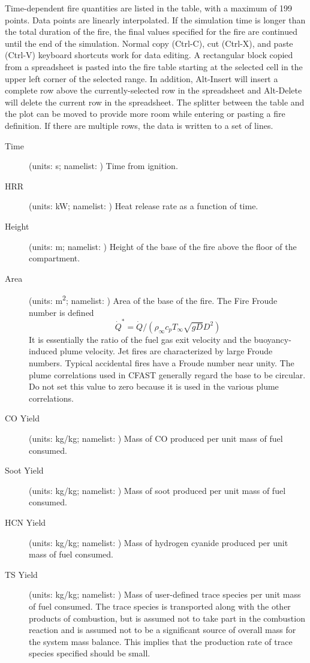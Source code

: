{{Time-dependent fire quantities are listed in the table, with a maximum of 199 points. Data points are linearly interpolated. If the simulation time is longer than the total duration of the fire, the final values specified for the fire are continued until the end of the simulation. Normal copy (Ctrl-C), cut (Ctrl-X), and paste (Ctrl-V) keyboard shortcuts work for data editing. A rectangular block copied from a spreadsheet is pasted into the fire table starting at the selected cell in the upper left corner of the selected range. In addition, Alt-Insert will insert a complete row above the currently-selected row in the spreadsheet and Alt-Delete will delete the current row in the spreadsheet. The splitter between the table and the plot can be moved to provide more room while entering or pasting a fire definition. If there are multiple rows, the data is written to a set of  lines.
\begin{description}
    \item[Time] (units: s; namelist: ) Time from ignition.
    \item[HRR] (units: kW; namelist: ) Heat release rate as a function of time.
    \item[Height] (units: m; namelist: ) Height of the base of the fire above the floor of the compartment.
    \item[Area] (units: \unit{m^2}; namelist: ) Area of the base of the fire.  The Fire Froude number is defined $$\dot{Q}^* = \dot{Q}/(\rho_\infty c_p T_\infty \sqrt{gD} D^2)$$ It is essentially the ratio of the fuel gas exit velocity and the buoyancy-induced plume velocity. Jet fires are characterized by large Froude numbers. Typical accidental fires have a Froude number near unity. The plume correlations used in CFAST generally regard the base to be circular. Do not set this value to zero because it is used in the various plume correlations.
    \item[CO Yield] (units: kg/kg; namelist: ) Mass of CO produced per unit mass of fuel consumed.
    \item[Soot Yield] (units: kg/kg; namelist: ) Mass of soot produced per unit mass of fuel consumed.
    \item[HCN Yield] (units: kg/kg; namelist: ) Mass of hydrogen cyanide produced per unit mass of fuel consumed.
    \item[TS Yield] (units: kg/kg; namelist: ) Mass of user-defined trace species per unit mass of fuel consumed. The trace species is transported along with the other products of combustion, but is assumed not to take part in the combustion reaction and is assumed not to be a significant source of overall mass for the system mass balance. This implies that the production rate of trace species specified should be small.
\end{description}


}}
